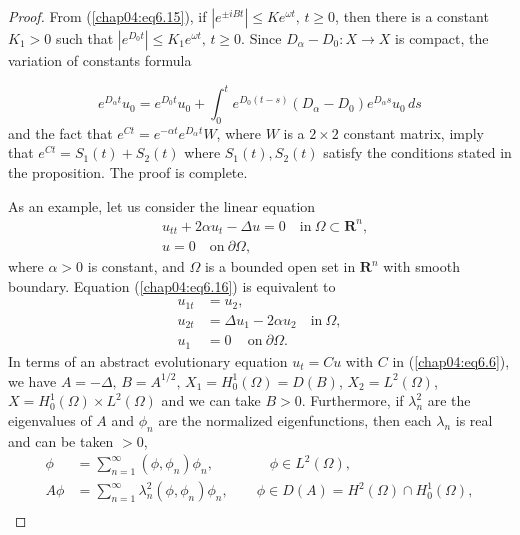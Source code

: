 \documentclass{surv-l}
\theoremstyle{plain}
\theoremstyle{definition}
\numberwithin{equation}{section}
\numberwithin{figure}{chapter}
\begin{document}
\begin{proof}
From (\ref{chap04:eq6.15}), if $|e^{\pm iBt}|\leq Ke^{\omega t},\, t\geq 0$, then there is a constant $K_{1}>0$ such that $|e^{D_{0}t}|\leq K_{1}e^{\omega t},\, t\geq 0$. Since $D_{\alpha}-D_{0}\!:X\rightarrow X$ is compact, the variation of constants formula

\begin{equation*}
e^{D_{\alpha}t}u_{0}=e^{D_{0}t}u_{0}+\int_{0}^{t}e^{D_{0}(t-s)}(D_{\alpha}-D_{0})e^{D_{\alpha}s}u_{0}\,ds
\end{equation*}
and the fact that $e^{Ct}=e^{-\alpha t}e^{D_{\alpha}}{}^{t}W$, where $W$ is a $2\times 2$ constant matrix, imply that $e^{Ct}=S_{1}(t)+S_{2}(t)$ where $S_{1}(t), S_{2}(t)$ satisfy the conditions stated in the proposition. The proof is complete.

As an example, let us consider the linear equation
\begin{equation}\label{chap04:eq6.16}
\begin{split}
&u_{tt}+2\alpha u_{t}-\Delta u=0 \quad \mathrm{in}\ \Omega \subset \mathbf{R}^{n},\\ &u=0 \quad \mathrm{on}\ \partial\Omega,
\end{split}
\end{equation}
where $\alpha>0$ is constant, and $\Omega$ is a bounded open set in $\mathbf{R}^{n}$ with smooth boundary. Equation (\ref{chap04:eq6.16}) is equivalent to
\begin{equation}\label{chap04:eq6.17}
\begin{split}
u_{1t}&=u_{2},\\
u_{2t}&=\Delta u_{1}-2\alpha u_{2}\quad \mathrm{in}\ \Omega,\\
u_{1}&=0\, \quad \mathrm{on}\ \partial\Omega.
\end{split}
\end{equation}
In terms of an abstract evolutionary equation $u_{t}=Cu$ with $C$ in (\ref{chap04:eq6.6}), we have $ A=-\Delta,\, B=A^{1/2},\, X_{1}=H_{0}^{1}(\Omega)=D(B)$, $X_{2}=L^{2}(\Omega)$, $X=H_{0}^{1}(\Omega)\times L^{2}(\Omega)$ and we can take $B>0$. Furthermore, if $\lambda_{n}^{2}$ are the eigenvalues of $A$ and $\phi_{n}$ are the normalized eigenfunctions, then each $\lambda_{n}$ is real and can be taken $>0$,
\begin{align*}
\phi &= \sum_{n=1}^{\infty}(\phi, \phi_{n})\phi_{n},\qquad\qquad \phi \in L^{2}(\Omega),\\
A\phi&=\sum_{n=1}^{\infty}\lambda_{n}^{2}(\phi, \phi_{n})\phi_{n}, \qquad \phi \in D(A)=H^{2}(\Omega) \cap H_{0}^{1}(\Omega),\\

\end{align*}
\end{proof}
\end{document}
